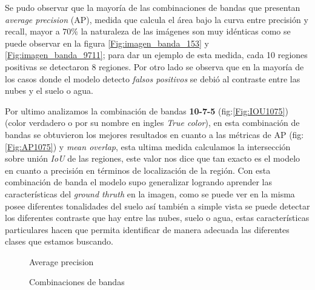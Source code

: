Se pudo observar que la mayoría de las combinaciones de bandas que presentan \textit{average precision} (AP), medida que calcula  el área bajo la curva entre precisión y recall, mayor a $70\%$ la naturaleza de las imágenes son muy idénticas como se puede observar en la figura \ref{Fig:imagen_banda_153} y \ref{Fig:imagen_banda_9711}; para dar un ejemplo de esta medida, cada 10 regiones positivas se detectaron $8$ regiones. Por otro lado se observa que en la mayoría de los casos donde el modelo detecto \textit{falsos positivos} se debió al contraste entre las nubes y el suelo o agua.



Por ultimo analizamos la combinación de bandas \textbf{10-7-5} (fig:\ref{Fig:IOU1075}) (color verdadero o por su nombre en ingles \textit{True color}), en esta combinación de bandas se obtuvieron los mejores resultados en cuanto a las métricas de AP (fig:\ref{Fig:AP1075}) y  \textit{mean overlap}, esta ultima medida calculamos la intersección sobre unión \textit{IoU} de las regiones, este valor nos dice que tan exacto es el modelo en cuanto a precisión en términos de localización de la región. Con esta combinación de banda el modelo supo generalizar logrando aprender las características del \textit{ground thruth} en la imagen, como se puede ver en la misma posee diferentes tonalidades del suelo así también a simple vista se puede detectar los diferentes contraste que hay entre las nubes, suelo o agua, estas características particulares hacen que permita identificar de manera adecuada las diferentes clases que estamos buscando.



\begin{figure}[htbp]
\centering
{}
\caption{Average precision} \label{fig:Average_precision}
\end{figure}


\begin{figure}[htbp]
\centering
{}
\caption{Combinaciones de bandas} \label{fig:COMB_BANDAS}
\end{figure}

